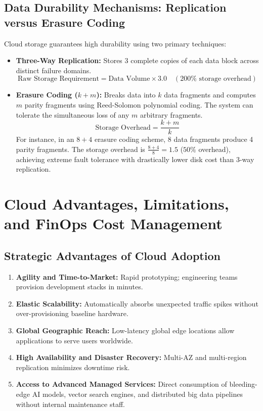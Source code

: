 \subsection{Data Durability Mechanisms: Replication versus Erasure Coding}
Cloud storage guarantees high durability using two primary techniques:
\begin{itemize}
    \item \textbf{Three-Way Replication:} Stores 3 complete copies of each data block across distinct failure domains.
    \begin{equation}
    \text{Raw Storage Requirement} = \text{Data Volume} \times 3.0 \quad (200\% \text{ storage overhead})
    \end{equation}
    \item \textbf{Erasure Coding ($k+m$):} Breaks data into $k$ data fragments and computes $m$ parity fragments using Reed-Solomon polynomial coding. The system can tolerate the simultaneous loss of any $m$ arbitrary fragments.
    \begin{equation}
    \text{Storage Overhead} = \frac{k + m}{k}
    \end{equation}
    For instance, in an $8+4$ erasure coding scheme, 8 data fragments produce 4 parity fragments. The storage overhead is $\frac{8+4}{8} = 1.5$ ($50\%$ overhead), achieving extreme fault tolerance with drastically lower disk cost than 3-way replication.
\end{itemize}


\section{Cloud Advantages, Limitations, and FinOps Cost Management}
\label{sec:cloud_advantages_finops}

\subsection{Strategic Advantages of Cloud Adoption}
\begin{enumerate}[label=\alph*.]
    \item \textbf{Agility and Time-to-Market:} Rapid prototyping; engineering teams provision development stacks in minutes.
    \item \textbf{Elastic Scalability:} Automatically absorbs unexpected traffic spikes without over-provisioning baseline hardware.
    \item \textbf{Global Geographic Reach:} Low-latency global edge locations allow applications to serve users worldwide.
    \item \textbf{High Availability and Disaster Recovery:} Multi-AZ and multi-region replication minimizes downtime risk.
    \item \textbf{Access to Advanced Managed Services:} Direct consumption of bleeding-edge AI models, vector search engines, and distributed big data pipelines without internal maintenance staff.
\end{enumerate}

